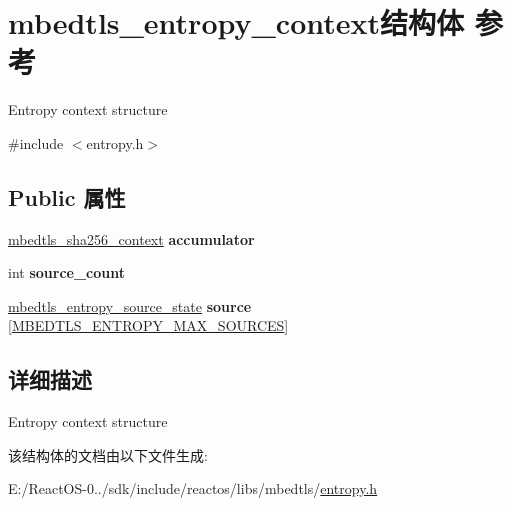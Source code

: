 \hypertarget{structmbedtls__entropy__context}{}\section{mbedtls\+\_\+entropy\+\_\+context结构体 参考}
\label{structmbedtls__entropy__context}


Entropy context structure  




{\ttfamily \#include $<$entropy.\+h$>$}

\subsection*{Public 属性}
\begin{DoxyCompactItemize}
\item 
\mbox{\label{structmbedtls__entropy__context_a5f6366b5c48672dedbb3d32857372675}} 
\hyperlink{structmbedtls__sha256__context}{mbedtls\+\_\+sha256\+\_\+context} {\bfseries accumulator}
\item 
\mbox{\label{structmbedtls__entropy__context_ae21caec42d2e42c87762fcbb4079cb1b}} 
int {\bfseries source\+\_\+count}
\item 
\mbox{\label{structmbedtls__entropy__context_a8a95d0e03ef1bc1f198e23e201c064be}} 
\hyperlink{structmbedtls__entropy__source__state}{mbedtls\+\_\+entropy\+\_\+source\+\_\+state} {\bfseries source} \mbox{[}\hyperlink{entropy_8h_a819aa4f3046aa257738f0dafe481ca1f}{M\+B\+E\+D\+T\+L\+S\+\_\+\+E\+N\+T\+R\+O\+P\+Y\+\_\+\+M\+A\+X\+\_\+\+S\+O\+U\+R\+C\+ES}\mbox{]}
\end{DoxyCompactItemize}


\subsection{详细描述}
Entropy context structure 

该结构体的文档由以下文件生成\+:\begin{DoxyCompactItemize}
\item 
E\+:/\+React\+O\+S-\/0../sdk/include/reactos/libs/mbedtls/\hyperlink{entropy_8h}{entropy.\+h}\end{DoxyCompactItemize}
